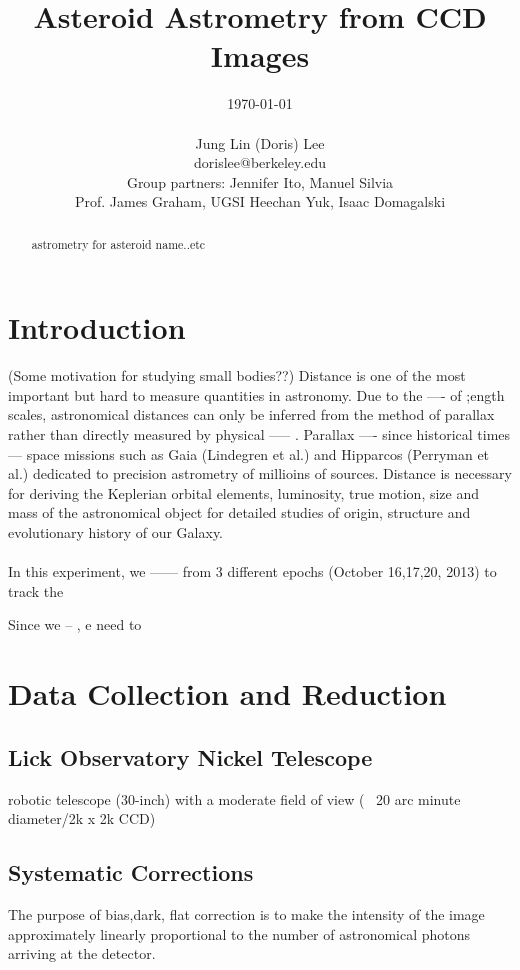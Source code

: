 \documentclass[authoryear, 12pt,5p, times]{elsarticle}
\begin{document}
\begin{frontmatter}
\title{Asteroid Astrometry from CCD Images}
\author{\today \\ \quad \\Jung Lin (Doris) Lee\\ dorislee@berkeley.edu\\Group partners: Jennifer Ito, Manuel Silvia\\Prof. James Graham, UGSI Heechan Yuk, Isaac Domagalski}
	\begin{abstract}
astrometry for asteroid name..etc
	\end{abstract}
\end{frontmatter}
\section{Introduction}
(Some motivation for studying small bodies??)
Distance is one of the most important but hard to measure quantities in astronomy. Due to the ---- of ;ength scales, astronomical distances can only be inferred from the method of parallax rather than directly measured by physical ----- . Parallax ---- since historical times--- space missions such as Gaia (Lindegren et al.) and  Hipparcos (Perryman et al.) dedicated to precision astrometry of millioins of sources. Distance is necessary for deriving the Keplerian orbital elements, luminosity, true motion, size and mass of the astronomical object for detailed studies of origin, structure and evolutionary history of our Galaxy.
\paragraph{}
In this experiment, we ------ from 3 different epochs (October 16,17,20, 2013)  to track the 
 

Since we -- , e need to 
\section{Data Collection and Reduction}
	\subsection{Lick Observatory Nickel Telescope}
	robotic telescope (30-inch) with a moderate field of view (~ 20 arc minute diameter/2k x 2k CCD)
	\subsection{Systematic  Corrections}
The purpose of bias,dark, flat correction is to make the intensity of the image approximately linearly proportional to the number of astronomical photons arriving at the detector.
\end{document}
